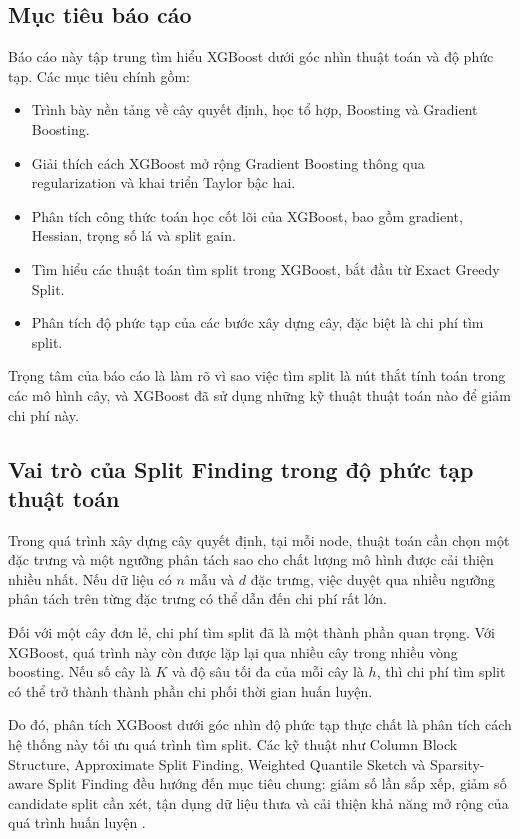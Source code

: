 \subsection{Mục tiêu báo cáo}

Báo cáo này tập trung tìm hiểu XGBoost dưới góc nhìn thuật toán và độ phức tạp. Các mục tiêu chính gồm:

\begin{itemize}
    \item Trình bày nền tảng về cây quyết định, học tổ hợp, Boosting và Gradient Boosting.
    \item Giải thích cách XGBoost mở rộng Gradient Boosting thông qua regularization và khai triển Taylor bậc hai.
    \item Phân tích công thức toán học cốt lõi của XGBoost, bao gồm gradient, Hessian, trọng số lá và split gain.
    \item Tìm hiểu các thuật toán tìm split trong XGBoost, bắt đầu từ Exact Greedy Split.
    \item Phân tích độ phức tạp của các bước xây dựng cây, đặc biệt là chi phí tìm split.
\end{itemize}

Trọng tâm của báo cáo là làm rõ vì sao việc tìm split là nút thắt tính toán trong các mô hình cây, và XGBoost đã sử dụng những kỹ thuật thuật toán nào để giảm chi phí này.

\subsection{Vai trò của Split Finding trong độ phức tạp thuật toán}

Trong quá trình xây dựng cây quyết định, tại mỗi node, thuật toán cần chọn một đặc trưng và một ngưỡng phân tách sao cho chất lượng mô hình được cải thiện nhiều nhất. Nếu dữ liệu có $n$ mẫu và $d$ đặc trưng, việc duyệt qua nhiều ngưỡng phân tách trên từng đặc trưng có thể dẫn đến chi phí rất lớn.

Đối với một cây đơn lẻ, chi phí tìm split đã là một thành phần quan trọng. Với XGBoost, quá trình này còn được lặp lại qua nhiều cây trong nhiều vòng boosting. Nếu số cây là $K$ và độ sâu tối đa của mỗi cây là $h$, thì chi phí tìm split có thể trở thành thành phần chi phối thời gian huấn luyện.

Do đó, phân tích XGBoost dưới góc nhìn độ phức tạp thực chất là phân tích cách hệ thống này tối ưu quá trình tìm split. Các kỹ thuật như Column Block Structure, Approximate Split Finding, Weighted Quantile Sketch và Sparsity-aware Split Finding đều hướng đến mục tiêu chung: giảm số lần sắp xếp, giảm số candidate split cần xét, tận dụng dữ liệu thưa và cải thiện khả năng mở rộng của quá trình huấn luyện \cite{chen2016xgboost}.